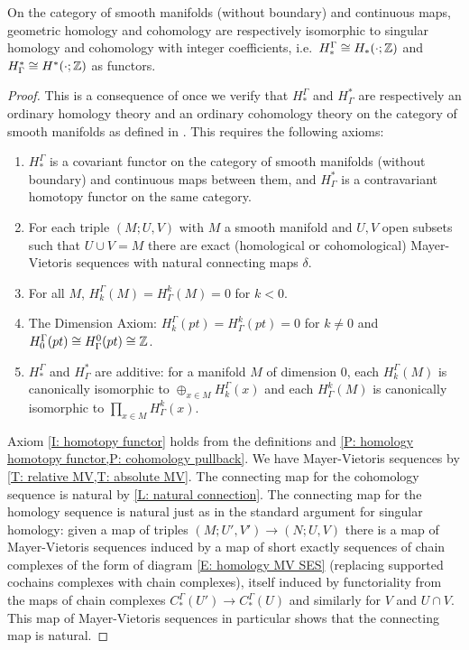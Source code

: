 \begin{theorem}\label{T: geometric is singular}
On the category of smooth manifolds (without boundary) and continuous maps, geometric homology and cohomology are respectively isomorphic to singular homology and cohomology with integer coefficients, i.e.\ $H_*^\Gamma\cong H_*(\cdot ;\mathbb{Z})$ and $H^*_\Gamma\cong H^*(\cdot ;\mathbb{Z})$ as functors.
\end{theorem}
\begin{proof}
This is a consequence of \cite[Theorem 10]{Krec10b} once we verify that $H_*^\Gamma$ and $H^*_\Gamma$ are respectively an ordinary homology theory and an ordinary cohomology theory on the category of smooth manifolds as defined in \cite{Krec10b}. This requires the following axioms:

\begin{enumerate}
\item \label{I: homotopy functor} $H_*^\Gamma$ is a covariant functor on the category of smooth manifolds (without boundary) and continuous maps between them, and $H^*_\Gamma$ is a contravariant homotopy functor on the same category.

\item For each triple $(M;U,V)$ with $M$ a smooth manifold and $U,V$ open subsets such that $U \cup V = M$ there are exact (homological or cohomological) Mayer-Vietoris sequences with natural connecting maps $\delta$.


\item\label{I: neg dim} For all $M$, $H_k^\Gamma(M) = H^k_\Gamma(M) = 0$ for $k<0$.


\item The Dimension Axiom: $H_k^\Gamma(pt) = H^k_\Gamma(pt) = 0$ for $k\neq 0$ and $H^\Gamma_0(pt)\cong H_\Gamma^0(pt)\cong \mathbb{Z}$.

\item $H_*^\Gamma$ and $H^*_\Gamma$ are additive: for a manifold $M$ of dimension $0$, each $H_k^\Gamma(M)$ is canonically isomorphic to $\oplus_{x \in M} H_k^\Gamma(x)$ and each $H^k_\Gamma(M)$ is canonically isomorphic to $\prod_{x \in M} H^k_\Gamma(x)$.
\end{enumerate}

Axiom \ref{I: homotopy functor} holds from the definitions and \cref{P: homology homotopy functor,P: cohomology pullback}.
We have Mayer-Vietoris sequences by \cref{T: relative MV,T: absolute MV}. The connecting map for the cohomology sequence is natural by \cref{L: natural connection}. The connecting map for the homology sequence is natural just as in the standard argument for singular homology: given a map of triples $(M;U',V') \to (N;U,V)$ there is a map of Mayer-Vietoris sequences induced by a map of short exactly sequences of chain complexes of the form of diagram \eqref{E: homology MV SES} (replacing supported cochains complexes with chain complexes), itself induced by functoriality from the maps of chain complexes $C_*^{\Gamma}(U') \to C_*^{\Gamma}(U)$ and similarly for $V$ and $U \cap V$. This map of Mayer-Vietoris sequences in particular shows that the connecting map is natural.



\end{proof}
